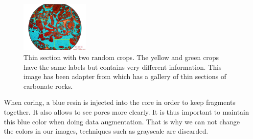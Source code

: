 \begin{figure}[h]
    \centering
        \includegraphics[width=0.3\textwidth]{figures/03-cropping_example_with2crops}
        \caption[Thin section with 2 random crops]{ Thin section with two random crops. The yellow and green crops have the same labels but contains very different information. This image has been adapter from \cite{section} which has a gallery of thin sections of carbonate rocks. }
        \label{fig:crops}
\end{figure}

When coring, a blue resin is injected into the core in order to keep fragments together. It also allows to see pores more clearly. It is thus important to maintain this blue color when doing data augmentation. That is why we can not change the colors in our images, techniques such as grayscale are discarded.


